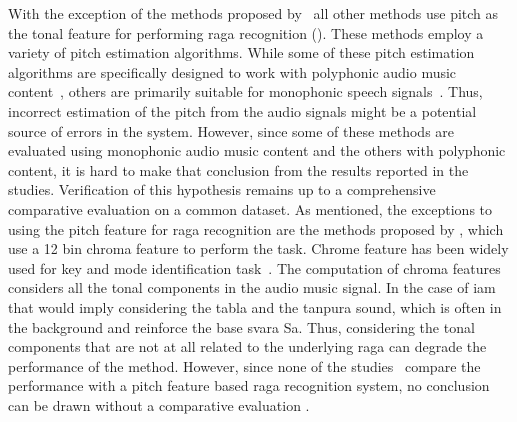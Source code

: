 {With the exception of the methods proposed by~\cite{dighe2013scale,dighe2013swara} all other methods use pitch as the tonal feature for performing \gls{raga} recognition (). These methods employ a variety of pitch estimation algorithms. While some of these pitch estimation algorithms are specifically designed to work with polyphonic audio music content~\cite{Salamon2012}, others are primarily suitable for monophonic speech signals~\cite{BoersmaPaul2001}. Thus, incorrect estimation of the pitch from the audio signals might be a potential source of errors in the system. However, since some of these methods are evaluated using monophonic audio music content and the others with polyphonic content, it is hard to make that conclusion from the results reported in the studies. Verification of this hypothesis remains up to a comprehensive comparative evaluation on a common dataset. As mentioned, the exceptions to using the pitch feature for \gls{raga} recognition are the methods proposed by \cite{dighe2013scale,dighe2013swara}, which use a 12 bin chroma feature to perform the task. Chrome feature has been widely used for key and mode identification task~. The computation of chroma features considers all the tonal components in the audio music signal. In the case of \gls{iam} that would imply considering the \gls{tabla} and the \gls{tanpura} sound, which is often in the background and reinforce the base \gls{svara} Sa. Thus, considering the tonal components that are not at all related to the underlying \gls{raga} can degrade the performance of the method. However, since none of the studies~\citep{dighe2013scale,dighe2013swara} compare the performance with a pitch feature based \gls{raga} recognition system, no conclusion can be drawn without a comparative evaluation .

}
